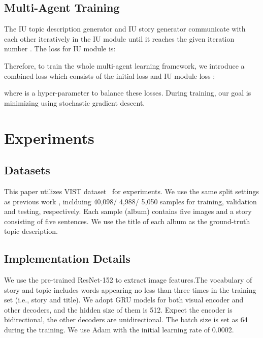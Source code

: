 \documentclass[11pt]{article}
\newcommand{\citep}{\cite}
\begin{document}
\subsection{Multi-Agent Training}
The IU topic description generator and IU story generator communicate with each other iteratively in the IU module until it reaches the given iteration number . 
The loss for IU module is:
{
\setlength\abovedisplayskip{1pt}
\setlength\belowdisplayskip{1pt}

}

Therefore, to train the whole multi-agent learning framework, we introduce a combined loss  which consists of the initial loss  and IU module loss :
{
\setlength\abovedisplayskip{1pt}
\setlength\belowdisplayskip{1pt}

}where  is a hyper-parameter to balance these losses. During training, our goal is minimizing  using stochastic gradient descent. 



\section{Experiments}

\subsection{Datasets}
This paper utilizes VIST dataset~\citep{huang2016visual} for experiments. We use the same split settings as previous work \citep{Wang:2018tda}, inclduing 40,098/ 4,988/ 5,050 samples for training, validation and testing, respectively. Each sample (album) contains five images and a story consisting of five sentences. We use the title of each album as the ground-truth topic description.

\subsection{Implementation Details}
We use the pre-trained ResNet-152 \citep{he2016deep} to extract image features.The vocabulary of story and topic includes words appearing no less than three times in the training set (i.e., story and title). We adopt GRU models for both visual encoder and other decoders, and the hidden size of them is 512. Expect the encoder is bidirectional, the other decoders are unidirectional. The batch size is set as 64 during the training. We use Adam \citep{kingma2015adam} with the initial learning rate of 0.0002.
\end{document}
